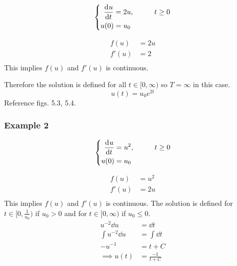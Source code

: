 \documentclass[12pt,twoside]{article}
\begin{document}
\begin{equation} \left\{
  \begin{aligned}
    \frac{\mathrm{d}^{} {u}}{\mathrm{d}{t}^{}} &= 2u,&\qquad t\ge0 \\
    u(0) &= u_0 \\
  \end{aligned}\right.
\end{equation}

\begin{equation}
  \begin{aligned}
    f(u) &= 2u \\
    f'(u) &= 2 \\
  \end{aligned}
\end{equation}
This implies $f(u)$ and $f'(u)$ is continuous.

Therefore the solution is defined for all $t\in[0,\infty)$ so $T=\infty$ in this
case.
\begin{equation}
  u(t) = u_0e^{2t}
\end{equation}
Reference figs. 5.3, 5.4.

\subsubsection{Example 2}
\begin{equation} \left\{
  \begin{aligned}
    \frac{\mathrm{d}^{} {u}}{\mathrm{d}{t}^{}} &= u^2, &\qquad t\ge0 \\
    u(0) &= u_0 \\
  \end{aligned} \right.
\end{equation}

\begin{equation}
  \begin{aligned}
    f(u) &= u^2 \\
    f'(u) &= 2u \\
  \end{aligned}
\end{equation}
This implies $f(u)$ and $f'(u)$ is continuous. The solution is defined for
$t\in[0,\frac{1}{u_0})$ if $u_0>0$ and for $t\in[0,\infty)$ if $u_0\le0$.
\begin{equation}
  \begin{aligned}
    u^{-2} \dd{u} &= \dd{t} \\
    \int u^{-2} \dd{u} &= \int \dd{t} \\
    -u^{-1} &= t+C \\
    \implies u(t) &= \frac{-1}{t+C} \\
  \end{aligned}
\end{equation}
\end{document}
